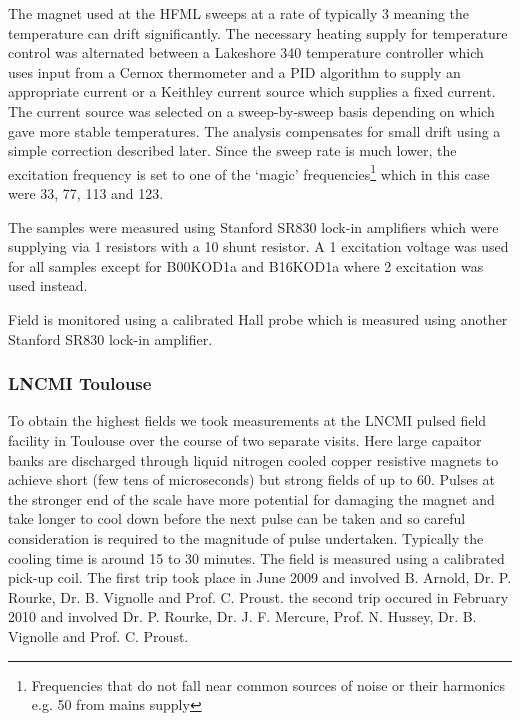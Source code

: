 The magnet used at the \ac{HFML} sweeps at a rate of typically \unit{3}{\tesla\per\minute} meaning the temperature can drift significantly. The necessary heating supply for temperature control was alternated between a Lakeshore 340 temperature controller which uses input from a Cernox thermometer and a PID algorithm to supply an appropriate current or a Keithley current source which supplies a fixed current. The current source was selected on a sweep-by-sweep basis depending on which gave more stable temperatures.  The analysis compensates for small drift using a simple correction described later. Since the sweep rate is much lower, the excitation frequency is set to one of the `magic' frequencies\footnote{Frequencies that do not fall near common sources of noise or their harmonics e.g. \unit{50}{\hertz} from mains supply} which in this case were \unit{33}{\hertz}, \unit{77}{\hertz}, \unit{113}{\hertz} and \unit{123}{\hertz}.

The samples were measured using Stanford SR830 lock-in amplifiers which were supplying via \unit{1}{\kilo\ohm} resistors with a \unit{10}{\ohm} shunt resistor. A \unit{1}{\volt} excitation voltage was used for all samples except for B00KOD1a and B16KOD1a where \unit{2}{\volt} excitation was used instead.

Field is monitored using a calibrated Hall probe which is measured using another Stanford SR830 lock-in amplifier.

\subsubsection{\ac{LNCMI} Toulouse}

To obtain the highest fields we took measurements at the \ac{LNCMI} pulsed field facility in Toulouse over the course of two separate visits. Here large capaitor banks are discharged through liquid nitrogen cooled copper resistive magnets to achieve short (few tens of microseconds) but strong fields of up to \unit{60}{\tesla}. Pulses at the stronger end of the scale have more potential for damaging the magnet and take longer to cool down before the next pulse can be taken and so careful consideration is required to the magnitude of pulse undertaken. Typically the cooling time is around 15 to 30 minutes. The field is measured using a calibrated pick-up coil. The first trip took place in June 2009 and involved B. Arnold, Dr. P. Rourke, Dr. B. Vignolle and Prof. C. Proust. the second trip occured in February 2010 and involved Dr. P. Rourke, Dr. J. F. Mercure, Prof. N. Hussey, Dr. B. Vignolle and Prof. C. Proust.

